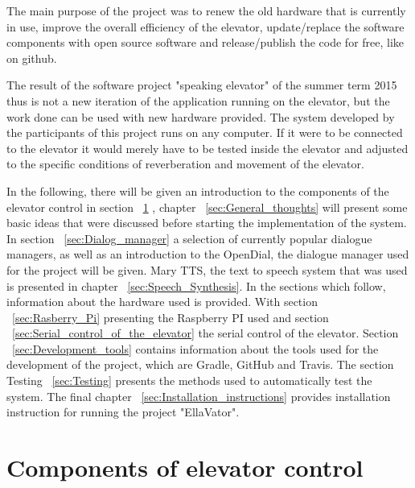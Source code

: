 \documentclass[a4paper, 12pt]{article}
\begin{document}
The main purpose of the project was to renew the old hardware that is currently
in use, improve the overall efficiency of the elevator, update/replace the software components with open source software and
release/publish the code for free, like on github.

The result of the software project "speaking elevator" of the summer term 2015
thus is not a new iteration of the application running on the elevator, but the
work done can be used with new hardware provided.
The system developed by the participants of this project runs on any computer.
If it were to be connected to the elevator it would merely have to be tested inside the elevator and adjusted to the specific conditions of reverberation and movement of the elevator. \newline

In the following, there will be given an introduction to the components of the elevator control in section  ~\ref{sec:Components_of_elevator_control} , chapter ~\ref{sec:General_thoughts} will present some basic ideas that were discussed before starting the implementation of the system.
In section ~\ref{sec:Dialog_manager} a selection of currently popular dialogue managers, as well as an introduction to the OpenDial, the dialogue manager used for the project will be given.
Mary TTS, the text to speech system that was used is presented in chapter ~\ref{sec:Speech_Synthesis}. \newline
In the sections which follow, information about the hardware used is provided.
With section ~\ref{sec:Rasberry_Pi} presenting the Raspberry PI used and section ~\ref{sec:Serial_control_of_the_elevator} the serial control of the elevator.
Section ~\ref{sec:Development_tools} contains information about the tools used for the development of the project, which are Gradle, GitHub and Travis.
The section Testing ~\ref{sec:Testing} presents the methods used to automatically test the system.
The final chapter ~\ref{sec:Installation_instructions} provides installation instruction for running the project "EllaVator".

\section{Components of elevator control}
\label{sec:Components_of_elevator_control}
\end{document}
